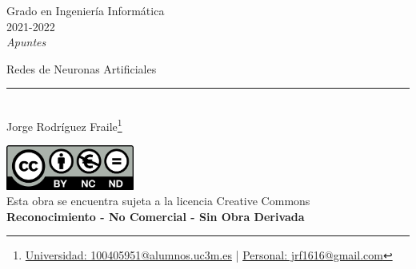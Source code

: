\documentclass[12pt, twoside, openright]{report} %
\begin{document}

\begin{titlepage}
	\begin{sffamily}
		\color{azulUC3M}
		\begin{center}
			\begin{figure}[H] %
			\end{figure}
			\vspace{2.5cm}
			\begin{Large}
				Grado en Ingeniería Informática\\
				2021-2022\\
				\vspace{2cm}
				\textsl{Apuntes}\\
				\bigskip
			\end{Large}
			{\Huge Redes de Neuronas Artificiales}\\
			\vspace*{0.5cm}
			\rule{10.5cm}{0.1mm}\\
			\vspace*{0.9cm}
			{\LARGE Jorge Rodríguez Fraile\footnote{\href{mailto:100405951@alumnos.uc3m.es}{Universidad: 100405951@alumnos.uc3m.es} | \href{mailto:jrf1616@gmail.com}{Personal: jrf1616@gmail.com}}}\\
			\vspace*{1cm}
		\end{center}
		\vfill
		\color{black}
		\includegraphics[width=4.2cm]{img/creativecommons.png}\\
		Esta obra se encuentra sujeta a la licencia Creative Commons\\ \textbf{Reconocimiento - No Comercial - Sin Obra Derivada}
	\end{sffamily}
\end{titlepage}


\tableofcontents
\thispagestyle{fancy}
\end{document}
